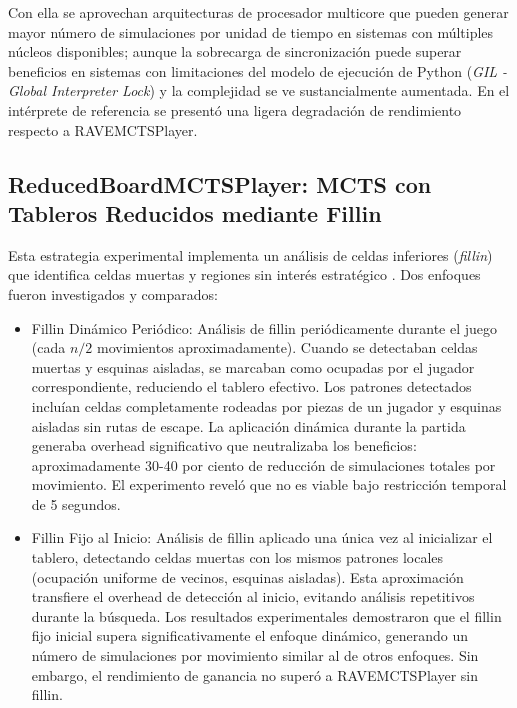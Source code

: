 \documentclass[12pt]{article}
\begin{document}
Con ella se aprovechan arquitecturas de procesador multicore que pueden generar mayor número de simulaciones por unidad de tiempo en sistemas con múltiples núcleos disponibles; aunque la sobrecarga de sincronización puede superar beneficios en sistemas con limitaciones del modelo de ejecución de Python (\textit{GIL - Global Interpreter Lock}) y la complejidad se ve sustancialmente aumentada. En el intérprete de referencia se presentó una ligera degradación de rendimiento respecto a RAVEMCTSPlayer.

\subsection{ReducedBoardMCTSPlayer: MCTS con Tableros Reducidos mediante Fillin}

Esta estrategia experimental implementa un análisis de celdas inferiores (\textit{fillin}) que identifica celdas muertas y regiones sin interés estratégico \cite{Arneson2010}. Dos enfoques fueron investigados y comparados:

\begin{itemize}
	\item Fillin Dinámico Periódico: Análisis de fillin periódicamente durante el juego (cada $n/2$ movimientos aproximadamente). Cuando se detectaban celdas muertas y esquinas aisladas, se marcaban como ocupadas por el jugador correspondiente, reduciendo el tablero efectivo. Los patrones detectados incluían celdas completamente rodeadas por piezas de un jugador y esquinas aisladas sin rutas de escape. La aplicación dinámica durante la partida generaba overhead significativo que neutralizaba los beneficios: aproximadamente 30-40 por ciento de reducción de simulaciones totales por movimiento. El experimento reveló que no es viable bajo restricción temporal de 5 segundos.
	
	\item Fillin Fijo al Inicio: Análisis de fillin aplicado una única vez al inicializar el tablero, detectando celdas muertas con los mismos patrones locales (ocupación uniforme de vecinos, esquinas aisladas). Esta aproximación transfiere el overhead de detección al inicio, evitando análisis repetitivos durante la búsqueda. Los resultados experimentales demostraron que el fillin fijo inicial supera significativamente el enfoque dinámico, generando un número de simulaciones por movimiento similar al de otros enfoques. Sin embargo, el rendimiento de ganancia no superó a RAVEMCTSPlayer sin fillin.
	\end{itemize}
	
\end{document}
